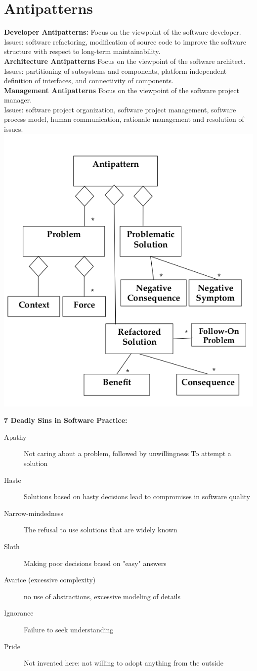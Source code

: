 
\section{Antipatterns}
\textbf{Developer Antipatterns:}
Focus on the viewpoint of the software developer.\\
Issues: software refactoring, modification of source code to
improve the software structure with respect to long-term
maintainability.\\
\textbf{Architecture Antipatterns}
Focus on the viewpoint of the software architect.\\
Issues: partitioning of subsystems and components, platform
independent definition of interfaces, and connectivity of
components.\\
\textbf{Management Antipatterns}
Focus on the viewpoint of the software project manager.\\
Issues: software project organization, software project
management, software process model, human communication,
rationale management and resolution of issues.\\

\includegraphics[width=.5\linewidth]{images/antipattern.png}

\textbf{7 Deadly Sins in Software Practice:}
\begin{description}
  \item[Apathy] Not caring about a problem, followed by unwillingness To attempt a solution
  \item[Haste] Solutions based on hasty decisions lead to compromises in software quality
  \item[Narrow-mindedness] The refusal to use solutions that are widely known
  \item[Sloth] Making poor decisions based on "easy" answers
  \item[Avarice (excessive complexity)] no use of abstractions, excessive modeling of details
  \item[Ignorance] Failure to seek understanding
  \item[Pride] Not invented here: not willing to adopt anything from the outside
\end{description}
\newpage


